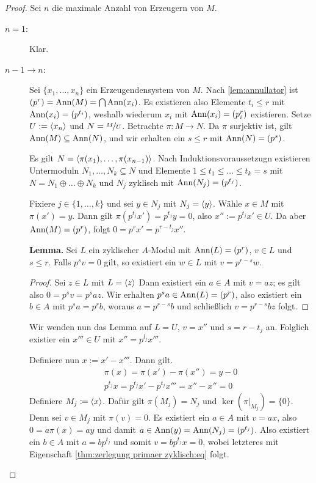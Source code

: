 \documentclass[12pt,a4paper]{scrartcl}
\theoremstyle{cplain}
\theoremstyle{cdef}
\begin{document}
\begin{proof}
	Sei $n$ die maximale Anzahl von Erzeugern von $M$.
	\begin{description}
		\item[$n = 1$:] Klar.
		\item[$n-1\to n$:] Sei $\{x_1,\dots, x_n\}$ ein Erzeugendensystem von $M$. Nach \cref{lem:annullator} ist $(p^r) = \operatorname{Ann}(M)  = \bigcap \operatorname{Ann}(x_i)$. Es existieren also Elemente $t_i\leq r$ mit $\operatorname{Ann}(x_i) = (p^{t_i})$, weshalb wiederum $x_i$ mit $\operatorname{Ann}(x_i) = (p_i^r)$ existieren. Setze $U := \langle x_n\rangle$ und $N = \nicefrac{M}{U}$. Betrachte $\pi\colon M\to N$. Da $\pi$ surjektiv ist, gilt $\operatorname{Ann}(M)\subseteq \operatorname{Ann}(N)$, und wir erhalten ein $s\leq r$ mit $\operatorname{Ann}(N) = (p^s)$.
		
		Es gilt $N = \langle\pi(x_1),\dots, \pi(x_{n-1})\rangle$. Nach Induktionsvoraussetzugn existieren Untermoduln $N_1,\dots, N_k\subseteq N$ und Elemente $1\leq t_1\leq\dots \leq t_k = s$ mit $N = N_1\oplus \dots \oplus N_k$ und $N_j$ zyklisch mit $\operatorname{Ann}(N_j) = (p^{t_j})$.
		
		
		Fixiere $j\in\{1,\dots, k\}$ und sei $y\in N_j$ mit $N_j = \langle y\rangle$. Wähle $x\in M$ mit $\pi(x') = y$. Dann gilt $\pi(p^{t_j}x') = p^{t_j}y = 0$, also $x'' := p^{t_j}x'\in U$. Da aber $\operatorname{Ann}(M) = (p^r)$, folgt $0 = p^rx' = p^{r-t_j}x''$.
		
		\textbf{Lemma.} Sei $L$ ein zyklischer $A$-Modul mit $\operatorname{Ann}(L) = (p^r)$, $v\in L$ und $s\le r$. Falls $p^sv = 0$ gilt, so existiert ein $w\in L$ mit $v = p^{r-s}w$.
		\begin{proof}
			Sei $z\in L$ mit $L = \langle z\rangle$ Dann existiert ein $a \in A$ mit $v = az$; es gilt also $0 = p^sv = p^saz$. Wir erhalten $p^sa\in \operatorname{Ann}(L) = (p^r)$, also existiert ein $b\in A$ mit $p^sa = p^rb$, woraus $a = p^{r-s}b$ und schließlich $v = p^{r-s}bz$ folgt.
		\end{proof}
			
		Wir wenden nun das Lemma auf $L = U$, $v = x''$ und $s = r-t_j$ an. Folglich existier ein $x'''\in U$ mit $x'' = p^{l_j}x'''$.
		
		Definiere nun $x := x'-x'''$. Dann gilt.
		\begin{gather*}
			\pi(x) = \pi(x')-\pi(x'') = y-0 \\
			p^{t_j}x = p^{t_j}x'-p^{t_j}x''' = x''-x'' = 0 \tag{*} \label{thm:zerlegung primaer zyklisch:eq}
		\end{gather*}
		Definiere $M_j\coloneqq \langle x\rangle$. Dafür gilt $\pi(M_j) = N_j$ und $\ker(\pi|_{M_j}) = \{0\}$. Denn sei $v\in M_j$ mit $\pi(v) = 0$. Es existiert ein $a\in A$ mit $v = ax$, also $0 = a\pi(x) = ay$ und damit $a \in \operatorname{Ann}(y) = \operatorname{Ann}(N_j) = (p^{t_j})$. Also existiert ein $b\in A$ mit $a = bp^{t_j}$ und somit $v = bp^{t_j}x  = 0$, wobei letzteres mit Eigenschaft \eqref{thm:zerlegung primaer zyklisch:eq} folgt.
		

\end{description}
\end{proof}
\end{document}

